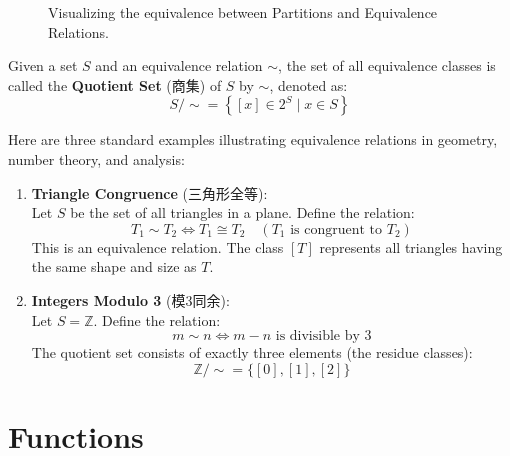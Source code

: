 \documentclass[
	UTF-8,
	11pt, %
	a4paper, %
]{LegrandOrangeBook}
\begin{document}
\begin{figure}[htbp]
    \caption{Visualizing the equivalence between Partitions and Equivalence Relations.}
\end{figure}

\begin{definition}
Given a set $S$ and an equivalence relation $\sim$, the set of all equivalence classes is called the \textbf{Quotient Set} (商集) of $S$ by $\sim$, denoted as:
$$ S / {\sim} = \left\{ [x] \in 2^S \mid x \in S \right\} $$
\end{definition}

\begin{example}
Here are three standard examples illustrating equivalence relations in geometry, number theory, and analysis:

\begin{enumerate}
    \item \textbf{Triangle Congruence} (三角形全等): \\
    Let $S$ be the set of all triangles in a plane. Define the relation:
    $$ T_1 \sim T_2 \iff T_1 \cong T_2 \quad (\text{$T_1$ is congruent to $T_2$}) $$
    This is an equivalence relation. The class $[T]$ represents all triangles having the same shape and size as $T$.
    
    \item \textbf{Integers Modulo 3} (模3同余): \\
    Let $S = \mathbb{Z}$. Define the relation:
    $$ m \sim n \iff m - n \text{ is divisible by } 3 $$
    The quotient set consists of exactly three elements (the residue classes):
    $$ \mathbb{Z} / {\sim} = \{ [0], [1], [2] \} $$
    
\end{enumerate}
\end{example}

\newpage

\section{Functions}
\end{document}
